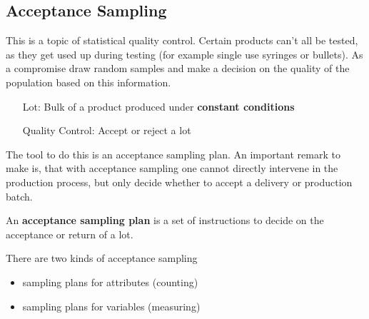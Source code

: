 \documentclass[11pt]{article}
\theoremstyle{definition}
\begin{document}


\subsection{Acceptance Sampling}
This is a topic of statistical quality control. Certain products can't all be tested, as they get used up during testing (for example single use syringes or bullets). As a compromise draw random samples and make a decision on the quality of the population based on this information.
\begin{itemize}[leftmargin=*, labelindent=3cm, labelsep=0.5cm]
	\item[Lot:] Bulk of a product produced under \textbf{constant conditions}
	\item[Quality Control:] Accept or reject a lot
\end{itemize}
The tool to do this is an acceptance sampling plan. An important remark to make is, that with acceptance sampling one cannot directly intervene in the production process, but only decide whether to accept a delivery or production batch.
\begin{definition}
	An \textbf{acceptance sampling plan} is a set of instructions to decide on the acceptance or return of a lot.
\end{definition}
There are two kinds of acceptance sampling
\begin{itemize}
	\item sampling plans for attributes (counting)
	\item sampling plans for variables (measuring)
\end{itemize}
\end{document}
